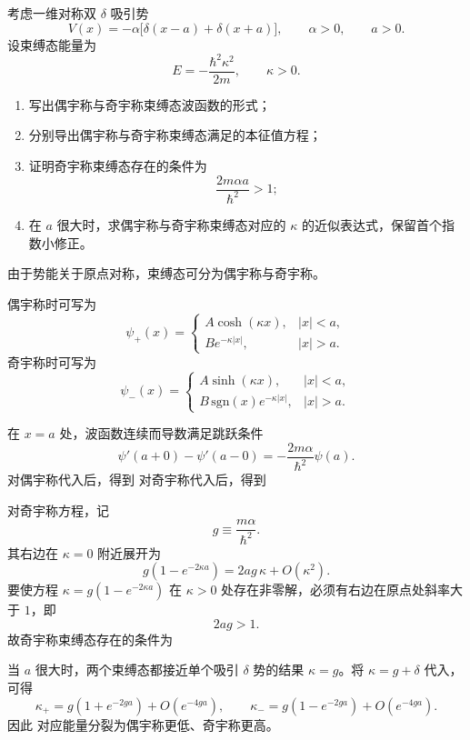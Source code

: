 ﻿

\begin{question}
考虑一维对称双 $\delta$ 吸引势
\[
V(x)=-\alpha\bigl[\delta(x-a)+\delta(x+a)\bigr],
\qquad \alpha>0,
\qquad a>0.
\]
设束缚态能量为
\[
E=-\frac{\hbar^2\kappa^2}{2m},\qquad \kappa>0.
\]

\begin{enumerate}[label=(\arabic*),leftmargin=2.5em]
  \item 写出偶宇称与奇宇称束缚态波函数的形式；
  \item 分别导出偶宇称与奇宇称束缚态满足的本征值方程；
  \item 证明奇宇称束缚态存在的条件为
  \[
  \frac{2m\alpha a}{\hbar^2}>1;
  \]
  \item 在 $a$ 很大时，求偶宇称与奇宇称束缚态对应的 $\kappa$ 的近似表达式，保留首个指数小修正。
\end{enumerate}

\begin{solution}
由于势能关于原点对称，束缚态可分为偶宇称与奇宇称。

偶宇称时可写为
\[
\psi_+(x)=
\begin{cases}
A\cosh(\kappa x),& |x|<a,\\
B e^{-\kappa |x|},& |x|>a.
\end{cases}
\]
奇宇称时可写为
\[
\psi_-(x)=
\begin{cases}
A\sinh(\kappa x),& |x|<a,\\
B\,\mathrm{sgn}(x)e^{-\kappa |x|},& |x|>a.
\end{cases}
\]

在 $x=a$ 处，波函数连续而导数满足跳跃条件
\[
\psi'(a+0)-\psi'(a-0)=-\frac{2m\alpha}{\hbar^2}\psi(a).
\]
对偶宇称代入后，得到
对奇宇称代入后，得到

对奇宇称方程，记
\[
g\equiv \frac{m\alpha}{\hbar^2}.
\]
其右边在 $\kappa=0$ 附近展开为
\[
g\left(1-e^{-2\kappa a}\right)=2ag\,\kappa+O(\kappa^2).
\]
要使方程 $\kappa=g(1-e^{-2\kappa a})$ 在 $\kappa>0$ 处存在非零解，必须有右边在原点处斜率大于 $1$，即
\[
2ag>1.
\]
故奇宇称束缚态存在的条件为

当 $a$ 很大时，两个束缚态都接近单个吸引 $\delta$ 势的结果 $\kappa=g$。将 $\kappa=g+\delta$ 代入，可得
\[
\kappa_+=g\left(1+e^{-2ga}\right)+O(e^{-4ga}),
\qquad
\kappa_-=g\left(1-e^{-2ga}\right)+O(e^{-4ga}).
\]
因此
对应能量分裂为偶宇称更低、奇宇称更高。
\end{solution}
\end{question}

